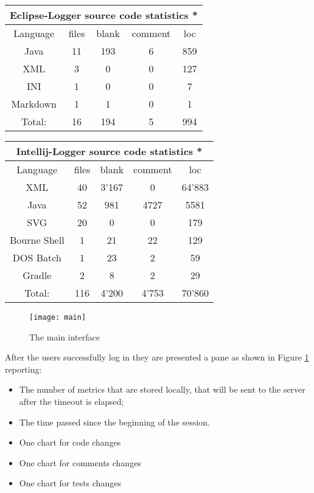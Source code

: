 \documentclass[a4paper,10pt]{report}
\begin{document}
\begin{center}
 \begin{tabular}{|c | c | c | c | c |}
 \hline
 \multicolumn{5}{|c|}{Eclipse-Logger source code statistics *}\\
 \hline
 Language & files & blank & comment & loc \\ [0.5ex] 
 \hline\hline
 Java & 11 & 193 & 6 & 859\\
 \hline
 XML & 3 & 0 & 0 & 127\\
 \hline
 INI & 1 & 0 & 0 & 7\\
 \hline
 Markdown & 1 & 1 & 0 & 1\\
 \hline
 \hline
 Total: & 16 & 194 & 5 & 994\\ [1ex]
 \hline
\end{tabular}
\end{center}

\begin{center}
 \begin{tabular}{|c | c | c | c | c |}
 \hline
 \multicolumn{5}{|c|}{Intellij-Logger source code statistics *}\\
 \hline
 Language & files & blank & comment & loc \\ [0.5ex] 
 \hline\hline
 XML & 40 & 3'167 & 0 & 64'883\\
 \hline
 Java & 52 & 981 & 4727 & 5581\\
 \hline
 SVG & 20 & 0 & 0 & 179\\
 \hline
 Bourne Shell & 1 & 21 & 22 & 129\\
 \hline
 DOS Batch & 1 & 23 & 2 & 59\\
 \hline
 Gradle & 2 & 8 & 2 & 29\\
 \hline
 \hline
 Total: & 116 & 4'200 & 4'753 & 70'860\\ [1ex]
 \hline
\end{tabular}
\end{center}







\newpage
\begin{figure}[h]
	\centering
	\texttt{[image: main]}
	\caption{The main interface}
	\label{fig:main}
\end{figure}

After the users successfully log in they are presented a pane as shown in Figure \ref{fig:main} reporting:

\begin{itemize}
	\item The number of metrics that are stored locally, that will be sent to the server after the timeout is elapsed;
	\item The time passed since the beginning of the session.
	\item One chart for code changes
	\item One chart for comments changes
	\item One chart for tests changes
\end{itemize}
\end{document}
